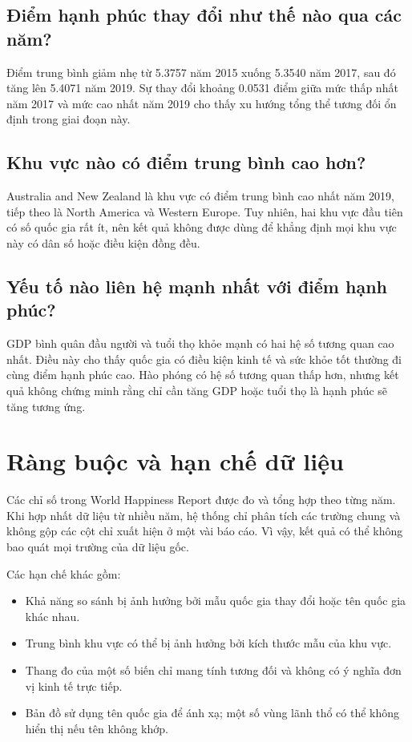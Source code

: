 \subsection{Điểm hạnh phúc thay đổi như thế nào qua các năm?}

Điểm trung bình giảm nhẹ từ 5.3757 năm 2015 xuống 5.3540 năm 2017, sau đó tăng lên 5.4071 năm 2019. Sự thay đổi khoảng 0.0531 điểm giữa mức thấp nhất năm 2017 và mức cao nhất năm 2019 cho thấy xu hướng tổng thể tương đối ổn định trong giai đoạn này.

\subsection{Khu vực nào có điểm trung bình cao hơn?}

Australia and New Zealand là khu vực có điểm trung bình cao nhất năm 2019, tiếp theo là North America và Western Europe. Tuy nhiên, hai khu vực đầu tiên có số quốc gia rất ít, nên kết quả không được dùng để khẳng định mọi khu vực này có dân số hoặc điều kiện đồng đều.

\subsection{Yếu tố nào liên hệ mạnh nhất với điểm hạnh phúc?}

GDP bình quân đầu người và tuổi thọ khỏe mạnh có hai hệ số tương quan cao nhất. Điều này cho thấy quốc gia có điều kiện kinh tế và sức khỏe tốt thường đi cùng điểm hạnh phúc cao. Hào phóng có hệ số tương quan thấp hơn, nhưng kết quả không chứng minh rằng chỉ cần tăng GDP hoặc tuổi thọ là hạnh phúc sẽ tăng tương ứng.

\section{Ràng buộc và hạn chế dữ liệu}

Các chỉ số trong World Happiness Report được đo và tổng hợp theo từng năm. Khi hợp nhất dữ liệu từ nhiều năm, hệ thống chỉ phân tích các trường chung và không gộp các cột chỉ xuất hiện ở một vài báo cáo. Vì vậy, kết quả có thể không bao quát mọi trường của dữ liệu gốc.

Các hạn chế khác gồm:

\begin{itemize}
    \item Khả năng so sánh bị ảnh hưởng bởi mẫu quốc gia thay đổi hoặc tên quốc gia khác nhau.
    \item Trung bình khu vực có thể bị ảnh hưởng bởi kích thước mẫu của khu vực.
    \item Thang đo của một số biến chỉ mang tính tương đối và không có ý nghĩa đơn vị kinh tế trực tiếp.
    \item Bản đồ sử dụng tên quốc gia để ánh xạ; một số vùng lãnh thổ có thể không hiển thị nếu tên không khớp.
\end{itemize}

